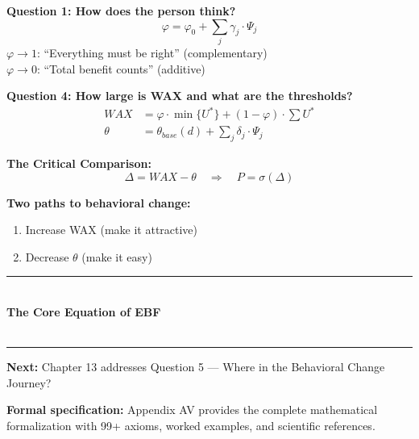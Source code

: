 \documentclass[11pt,a4paper]{book}
\theoremstyle{definition}
\theoremstyle{remark}
\begin{document}
\begin{tcolorbox}[
  title={\textbf{Chapter 12: Key Takeaways}},
  colback=green!3,
  colframe=green!40!black,
  fonttitle=\bfseries\sffamily
]

\textbf{Question 1: How does the person think?}
\begin{equation*}
\varphi = \varphi_0 + \sum_j \gamma_j \cdot \Psi_j
\end{equation*}
$\varphi \to 1$: ``Everything must be right'' (complementary)\\
$\varphi \to 0$: ``Total benefit counts'' (additive)

\vspace{6pt}
\textbf{Question 4: How large is WAX and what are the thresholds?}
\begin{align*}
WAX &= \varphi \cdot \min\{U^*\} + (1-\varphi) \cdot \sum U^*\\
\theta &= \theta_{base}(d) + \sum_j \delta_j \cdot \Psi_j
\end{align*}

\textbf{The Critical Comparison:}
\begin{equation*}
\Delta = WAX - \theta \quad \Rightarrow \quad P = \sigma(\Delta)
\end{equation*}

\textbf{Two paths to behavioral change:}
\begin{enumerate}
\item Increase WAX (make it attractive)
\item Decrease $\theta$ (make it easy)
\end{enumerate}

\end{tcolorbox}

\vspace{1cm}

\begin{center}
\rule{0.5\textwidth}{0.5pt}\\[0.5cm]
{\Large\bfseries The Core Equation of EBF}\\[0.5cm]
\\[0.5cm]
\rule{0.5\textwidth}{0.5pt}
\end{center}

\vspace{1cm}

\textbf{Next:} Chapter 13 addresses Question 5 — Where in the Behavioral Change Journey?

\textbf{Formal specification:} Appendix AV provides the complete mathematical formalization with 99+ axioms, worked examples, and scientific references.

\end{document}
